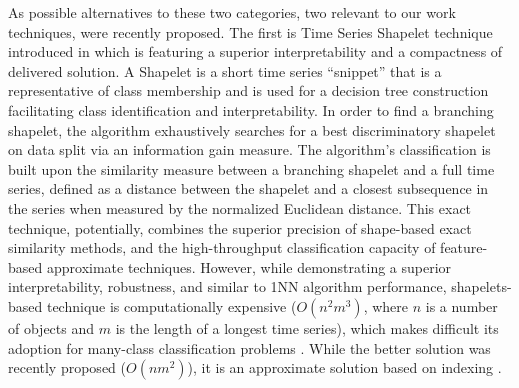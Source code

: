 \documentclass[conference]{IEEEtran}
\begin{document}
As possible alternatives to these two categories, two relevant to our work techniques, 
were recently proposed. 
The first is Time Series Shapelet technique introduced in \cite{shapelet} which
is featuring a superior interpretability and a compactness of delivered solution. 
A Shapelet is a short time series ``snippet'' that is a representative of class
membership and is used for a decision tree construction facilitating class 
identification and interpretability.
In order to find a branching shapelet, the algorithm exhaustively searches for a best 
discriminatory shapelet on data split via an information gain measure. 
The algorithm's classification is built upon the similarity measure between a branching 
shapelet and a full time series, defined as a distance between the shapelet and a closest 
subsequence in the series when measured by the normalized Euclidean distance. 
This exact technique, potentially, combines the superior precision of 
shape-based exact similarity methods, and the high-throughput 
classification capacity of feature-based approximate techniques. 
However, while demonstrating a superior interpretability, robustness, and similar to 1NN 
algorithm performance, shapelets-based technique is computationally expensive 
($O(n^{2}m^{3})$, where $n$ is a number of objects and $m$ is the length of a 
longest time series),
which makes difficult its adoption for many-class classification problems \cite{bagnal}. 
While the better solution was recently proposed ($O(nm^{2})$), it is an approximate 
solution based on indexing \cite{fast-shapelets}.
\end{document}
